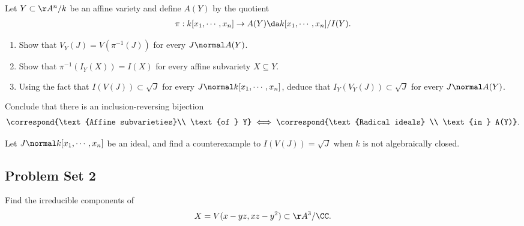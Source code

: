 \begin{exercise}

Let \(Y\subset \AA^n/k\) be an affine variety and define \(A(Y)\) by the
quotient
\begin{align*}  
\pi: k[x_1,\cdots, x_n] \to A(Y) \da k[x_1, \cdots, x_n]/I(Y)
.\end{align*}

\begin{enumerate}
\def\labelenumi{\alph{enumi}.}
\item
  Show that \(V_Y(J) = V(\pi^{-1}(J))\) for every \(J\normal A(Y)\).
\item
  Show that \(\pi^{-1} (I_Y(X)) = I(X)\) for every affine subvariety
  \(X\subseteq Y\).
\item
  Using the fact that \(I(V(J)) \subset \sqrt{J}\) for every
  \(J\normal k[x_1, \cdots, x_n]\), deduce that
  \(I_Y(V_Y(J)) \subset \sqrt{J}\) for every \(J\normal A(Y)\).
\end{enumerate}

Conclude that there is an inclusion-reversing bijection
\begin{align*}  
  \correspond{\text{Affine subvarieties}\\ \text{of } Y} \iff \correspond{\text{Radical ideals} \\ \text{in } A(Y)}
  .\end{align*}

\end{exercise}

\begin{exercise}[Extra]

Let \(J \normal k[x_1, \cdots, x_n]\) be an ideal, and find a
counterexample to \(I(V(J)) =\sqrt{J}\) when \(k\) is not algebraically
closed.

\end{exercise}

\hypertarget{problem-set-2}{%
\subsection{Problem Set 2}\label{problem-set-2}}

\begin{exercise}[Gathmann 2.17]

Find the irreducible components of
\begin{align*}  
X = V(x - yz, xz - y^2) \subset \AA^3/\CC
.\end{align*}

\end{exercise}

